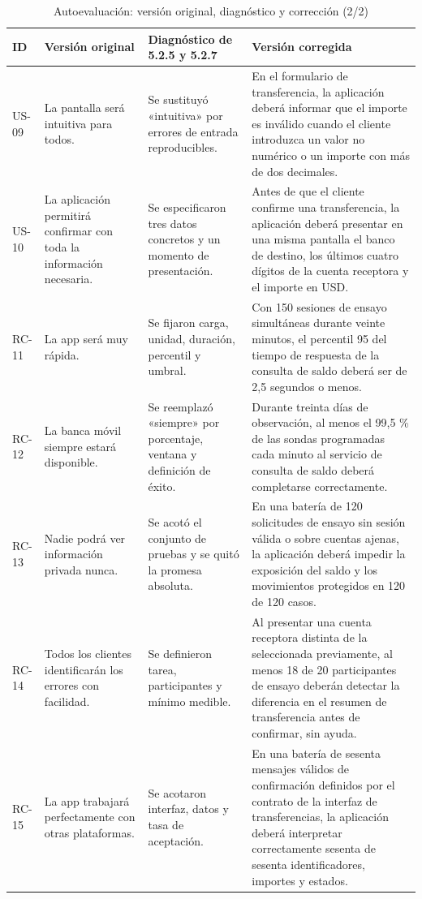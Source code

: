 \documentclass[conference,a4paper]{IEEEtran}
\begin{document}
\begin{table}[!t]
\centering\caption{Autoevaluación: versión original, diagnóstico y corrección (2/2)}
\fontsize{7.4}{8.6}\selectfont
\begin{tabularx}{\textwidth}{@{}p{0.70cm}p{3.45cm}p{3.45cm}Y@{}}
\toprule ID & Versión original & Diagnóstico de 5.2.5 y 5.2.7 & Versión corregida \\
\midrule
US-09 & La pantalla será intuitiva para todos. & Se sustituyó «intuitiva» por errores de entrada reproducibles. & En el formulario de transferencia, la aplicación deberá informar que el importe es inválido cuando el cliente introduzca un valor no numérico o un importe con más de dos decimales. \\
US-10 & La aplicación permitirá confirmar con toda la información necesaria. & Se especificaron tres datos concretos y un momento de presentación. & Antes de que el cliente confirme una transferencia, la aplicación deberá presentar en una misma pantalla el banco de destino, los últimos cuatro dígitos de la cuenta receptora y el importe en USD. \\
RC-11 & La app será muy rápida. & Se fijaron carga, unidad, duración, percentil y umbral. & Con 150 sesiones de ensayo simultáneas durante veinte minutos, el percentil 95 del tiempo de respuesta de la consulta de saldo deberá ser de 2,5 segundos o menos. \\
RC-12 & La banca móvil siempre estará disponible. & Se reemplazó «siempre» por porcentaje, ventana y definición de éxito. & Durante treinta días de observación, al menos el 99,5 \% de las sondas programadas cada minuto al servicio de consulta de saldo deberá completarse correctamente. \\
RC-13 & Nadie podrá ver información privada nunca. & Se acotó el conjunto de pruebas y se quitó la promesa absoluta. & En una batería de 120 solicitudes de ensayo sin sesión válida o sobre cuentas ajenas, la aplicación deberá impedir la exposición del saldo y los movimientos protegidos en 120 de 120 casos. \\
RC-14 & Todos los clientes identificarán los errores con facilidad. & Se definieron tarea, participantes y mínimo medible. & Al presentar una cuenta receptora distinta de la seleccionada previamente, al menos 18 de 20 participantes de ensayo deberán detectar la diferencia en el resumen de transferencia antes de confirmar, sin ayuda. \\
RC-15 & La app trabajará perfectamente con otras plataformas. & Se acotaron interfaz, datos y tasa de aceptación. & En una batería de sesenta mensajes válidos de confirmación definidos por el contrato de la interfaz de transferencias, la aplicación deberá interpretar correctamente sesenta de sesenta identificadores, importes y estados. \\
\bottomrule
\end{tabularx}
\end{table}
\end{document}
